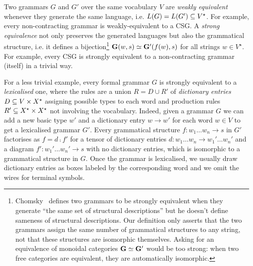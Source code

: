 Two grammars $G$ and $G'$ over the same vocabulary $V$ are \emph{weakly equivalent} whenever they generate the same language, i.e. $L(G) = L(G') \subseteq V^\star$.
For example, every non-contracting grammar is weakly-equivalent to a CSG.
A \emph{strong equivalence} not only preserves the generated languages but also the grammatical structure, i.e. it defines a bijection\footnote
{Chomsky~\cite{Chomsky63} defines two grammars to be strongly equivalent when they generate ``the same set of structural descriptions'' but he doesn't define sameness of structural descriptions.
Our definition only asserts that the two grammars assign the same number of grammatical structures to any string, not that these structures are isomorphic themselves.
Asking for an equivalence of monoidal categories $\mathbf{G} \simeq \mathbf{G}'$ would be too strong: when two free categories are equivalent, they are automatically isomorphic.} $\mathbf{G}(w, s) \simeq \mathbf{G}'(f(w), s)$ for all strings $w \in V^\star$.
For example, every CSG is strongly equivalent to a non-contracting grammar (itself) in a trivial way.

For a less trivial example, every formal grammar $G$ is strongly equivalent to a \emph{lexicalised} one, where the rules are a union $R = D \cup R'$ of \emph{dictionary entries} $D \subseteq V \times X^\star$ assigning possible types to each word and production rules $R' \subseteq X^\star \times X^\star$ not involving the vocabulary.
Indeed, given a grammar $G$ we can add a new basic type $w'$ and a dictionary entry $w \to w'$ for each word $w \in V$ to get a lexicalised grammar $G'$.
Every grammatical structure $f : w_1 \dots w_n \to s$ in $G'$ factorises as $f = d \fcmp f'$ for a tensor of dictionary entries $d : w_1 \dots w_n \to w_1' \dots w_n'$ and a diagram $f' : w_1' \dots w_n' \to s$ with no dictionary entries, which is isomorphic to a grammatical structure in $G$.
Once the grammar is lexicalised, we usually draw dictionary entries as boxes labeled by the corresponding word and we omit the wires for terminal symbols.

